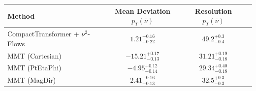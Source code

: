     \begin{tabular}{lccc}
        \toprule
        Method & Mean Deviation $p_{T}(\bar{\nu})$ & Resolution $p_{T}(\bar{\nu})$ \\
        \midrule
        CompactTransformer + $\nu^2$-Flows & $1.21^{+0.16}_{-0.22}$ & $49.2^{+0.3}_{-0.4}$ \\
        MMT (Cartesian) & $-15.21^{+0.17}_{-0.13}$ & $31.21^{+0.19}_{-0.18}$ \\
        MMT (PtEtaPhi) & $-4.95^{+0.12}_{-0.14}$ & $29.34^{+0.40}_{-0.18}$ \\
        MMT (MagDir) & $2.41^{+0.16}_{-0.13}$ & $32.5^{+0.3}_{-0.3}$ \\
        \bottomrule
    \end{tabular}
